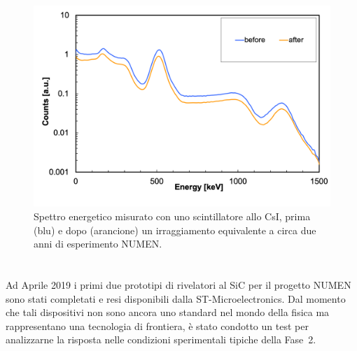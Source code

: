 \begin{figure} [!p]
	\centering
	\includegraphics[width=\textwidth, keepaspectratio]{Grafici/spettro_csi.png}
	\caption{Spettro energetico misurato con uno scintillatore allo CsI, prima (blu) e dopo (arancione) un irraggiamento equivalente a circa due anni di esperimento NUMEN.} \label{fig:spettro_csi}
\end{figure}






\section{} \label{sez:test}

Ad Aprile 2019 i primi due prototipi di rivelatori al SiC per il progetto NUMEN sono stati completati e resi disponibili dalla ST-Microelectronics. Dal momento che tali dispositivi non sono ancora uno standard nel mondo della fisica ma rappresentano una tecnologia di frontiera, è stato condotto un test per analizzarne la risposta nelle condizioni sperimentali tipiche della Fase~2.

